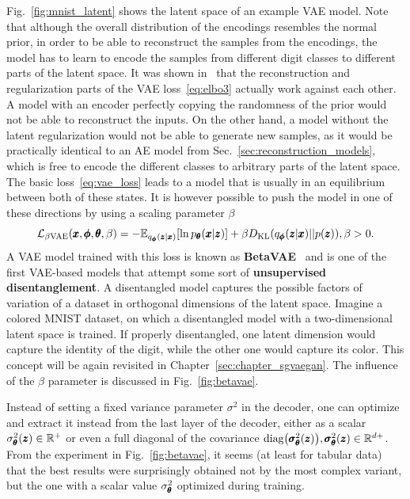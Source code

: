 Fig.~\ref{fig:mnist_latent} shows the latent space of an example VAE model. Note that although the overall distribution of the encodings resembles the normal prior, in order to be able to reconstruct the samples from the encodings, the model has to learn to encode the samples from different digit classes to different parts of the latent space. It was shown in~\cite{higgins2017beta} that the reconstruction and regularization parts of the VAE loss~\eqref{eq:elbo3} actually work against each other. A model with an encoder perfectly copying the randomness of the prior would not be able to reconstruct the inputs. On the other hand, a model without the latent regularization would not be able to generate new samples, as it would be practically identical to an AE model from Sec.~\ref{sec:reconstruction_models}, which is free to encode the different classes to arbitrary parts of the latent space. The basic loss~\eqref{eq:vae_loss} leads to a model that is usually in an equilibrium between both of these states. It is however possible to push the model in one of these directions by using a scaling parameter $\beta$
\begin{equation} \label{eq:betavae}
\mathcal{L}_{\beta\text{VAE}}(\vc{x},\vc{\phi},\vc{\theta},\beta)= - \mathbb{E}_{q_{\vc{\phi}}(\vc{z}|\vc{x})}\left[\ln p_{\vc{\theta}}(\vc{x}|\vc{z})\right] + \beta D_{\text{KL}}\left(q_{\vc{\phi}}(\vc{z}|\vc{x})||p(\vc{z})\right),\beta>0.
\end{equation}
A VAE model trained with this loss is known as \textbf{BetaVAE}~\cite{higgins2017beta} and is one of the first VAE-based models that attempt some sort of \textbf{unsupervised disentanglement}. A disentangled model captures the possible factors of variation of a dataset in orthogonal dimensions of the latent space. Imagine a colored MNIST dataset, on which a disentangled model with a two-dimensional latent space is trained. If properly disentangled, one latent dimension would capture the identity of the digit, while the other one would capture its color. This concept will be again revisited in Chapter~\ref{sec:chapter_sgvaegan}. The influence of the $\beta$ parameter is discussed in Fig.~\ref{fig:betavae}.

Instead of setting a fixed variance parameter $\sigma^2$ in the decoder, one can optimize and extract it instead from the last layer of the decoder, either as a scalar $\sigma^2_{\pmb{{\theta}}}(\pmb{{z}}) \in \mathbb{R}^+$
or even a full diagonal of the covariance $\text{diag}\left(\vc{\sigma}^2_{\vc{\theta}}(\vc{z})\right),\vc{\sigma}^2_{\vc{\theta}}(\vc{z})\in\mathbb{R}^{d+}$. From the experiment in Fig.~\ref{fig:betavae}, it seems (at least for tabular data) that the best results were surprisingly obtained not by the most complex variant, but the one with a scalar value $\sigma^2_{\pmb{{\theta}}}$ optimized during training.

